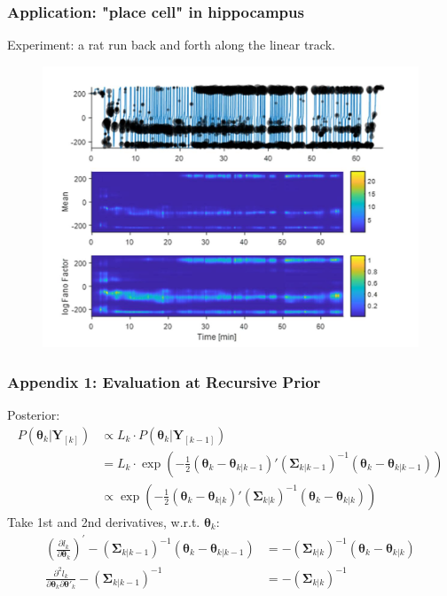 \documentclass{beamer}
\begin{document}
	\begin{frame}
		\frametitle{Application: "place cell" in hippocampus}
		Experiment: a rat run back and forth along the linear track.
		\begin{figure}
			\includegraphics[width=0.7\linewidth]{hippo.jpg}
		\end{figure}
	\end{frame}
	
	\begin{frame}
		\frametitle{Appendix 1: Evaluation at Recursive Prior}
		Posterior:
		\begin{align*}
			P(\bm{\theta}_k |\bm{Y}_{[k]}) &\propto L_k\cdot P(\bm{\theta}_k|\bm{Y}_{[k-1]})\\
			&= L_k \cdot \exp\left( - \frac{1}{2}\left( \bm{\theta}_{k} - \bm{\theta}_{k|k - 1} \right)'\left( \bm{\Sigma}_{k|k - 1} \right)^{- 1}\left( \bm{\theta}_{k} - \bm{\theta}_{k|k - 1} \right) \right)\\
			&\propto \exp\left( - \frac{1}{2}\left( \bm{\theta}_{k} - \bm{\theta}_{k|k} \right)'\left( \bm{\Sigma}_{k|k} \right)^{- 1}\left( \bm{\theta}_{k} - \bm{\theta}_{k|k} \right) \right)
		\end{align*}
		Take 1st and 2nd derivatives, w.r.t. $\bm{\theta}_k$:
		\begin{align*}
			\left( \frac{\partial l_{k}}{\partial\bm{\theta}_{k}} \right)^{'} - \left( \bm{\Sigma}_{k|k - 1} \right)^{- 1}\left( \bm{\theta}_{k} - \bm{\theta}_{k|k - 1} \right) &= - \left( \bm{\Sigma}_{k|k} \right)^{- 1}\left( \bm{\theta}_{k} - \bm{\theta}_{k|k} \right)\\
			\frac{\partial^{2}l_{k}}{\partial\bm{\theta}_{k}\partial\bm{\theta}'_{k}} - \left( \bm{\Sigma}_{k|k - 1} \right)^{- 1} &= - \left( \bm{\Sigma}_{k|k} \right)^{- 1}
		\end{align*}
	\end{frame}
	
\end{document}
